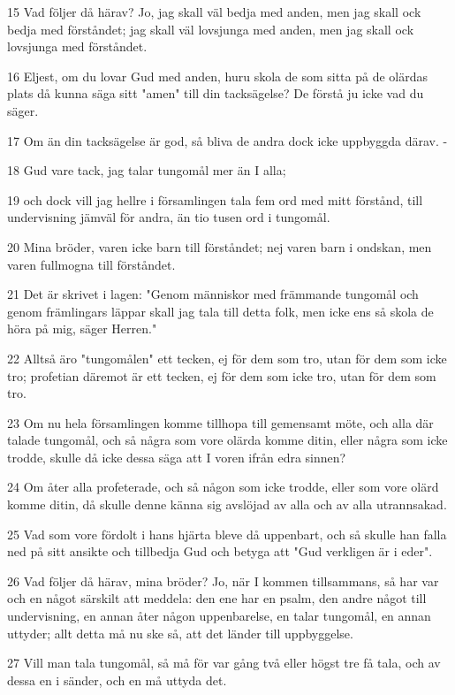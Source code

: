 \par 15 Vad följer då härav? Jo, jag skall väl bedja med anden, men jag skall ock bedja med förståndet; jag skall väl lovsjunga med anden, men jag skall ock lovsjunga med förståndet.
\par 16 Eljest, om du lovar Gud med anden, huru skola de som sitta på de olärdas plats då kunna säga sitt "amen" till din tacksägelse? De förstå ju icke vad du säger.
\par 17 Om än din tacksägelse är god, så bliva de andra dock icke uppbyggda därav. -
\par 18 Gud vare tack, jag talar tungomål mer än I alla;
\par 19 och dock vill jag hellre i församlingen tala fem ord med mitt förstånd, till undervisning jämväl för andra, än tio tusen ord i tungomål.
\par 20 Mina bröder, varen icke barn till förståndet; nej varen barn i ondskan, men varen fullmogna till förståndet.
\par 21 Det är skrivet i lagen: "Genom människor med främmande tungomål och genom främlingars läppar skall jag tala till detta folk, men icke ens så skola de höra på mig, säger Herren."
\par 22 Alltså äro "tungomålen" ett tecken, ej för dem som tro, utan för dem som icke tro; profetian däremot är ett tecken, ej för dem som icke tro, utan för dem som tro.
\par 23 Om nu hela församlingen komme tillhopa till gemensamt möte, och alla där talade tungomål, och så några som vore olärda komme ditin, eller några som icke trodde, skulle då icke dessa säga att I voren ifrån edra sinnen?
\par 24 Om åter alla profeterade, och så någon som icke trodde, eller som vore olärd komme ditin, då skulle denne känna sig avslöjad av alla och av alla utrannsakad.
\par 25 Vad som vore fördolt i hans hjärta bleve då uppenbart, och så skulle han falla ned på sitt ansikte och tillbedja Gud och betyga att "Gud verkligen är i eder".
\par 26 Vad följer då härav, mina bröder? Jo, när I kommen tillsammans, så har var och en något särskilt att meddela: den ene har en psalm, den andre något till undervisning, en annan åter någon uppenbarelse, en talar tungomål, en annan uttyder; allt detta må nu ske så, att det länder till uppbyggelse.
\par 27 Vill man tala tungomål, så må för var gång två eller högst tre få tala, och av dessa en i sänder, och en må uttyda det.
